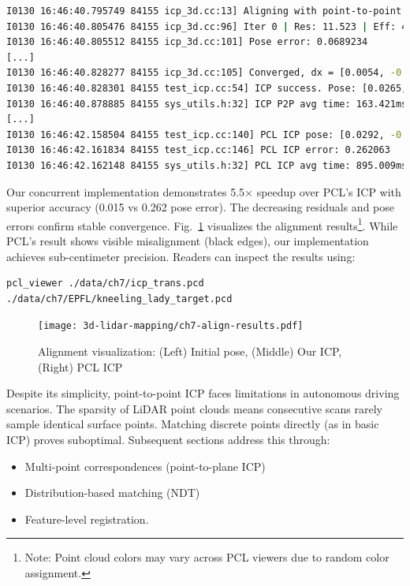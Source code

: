 \begin{lstlisting}[language=sh,caption=Terminal output]
I0130 16:46:40.795749 84155 icp_3d.cc:13] Aligning with point-to-point ICP
I0130 16:46:40.805476 84155 icp_3d.cc:96] Iter 0 | Res: 11.523 | Eff: 44455 | Avg: 0.000259 | dx: 0.027
I0130 16:46:40.805512 84155 icp_3d.cc:101] Pose error: 0.0689234
[...]
I0130 16:46:40.828277 84155 icp_3d.cc:105] Converged, dx = [0.0054, -0.0021, -0.0035, -0.0009, 0.0018, -0.0023]
I0130 16:46:40.828301 84155 test_icp.cc:54] ICP success. Pose: [0.0265, -0.0107, -0.0235, 0.9993], [-0.0689, -0.1033, 0.0050]
I0130 16:46:40.878885 84155 sys_utils.h:32] ICP P2P avg time: 163.421ms (1 runs)
[...] 
I0130 16:46:42.158504 84155 test_icp.cc:140] PCL ICP pose: [0.0292, -0.0092, -0.0195, 0.9993], [-0.0636, -0.0567, 0.0027]
I0130 16:46:42.161834 84155 test_icp.cc:146] PCL ICP error: 0.262063
I0130 16:46:42.162148 84155 sys_utils.h:32] PCL ICP avg time: 895.009ms (1 runs)
\end{lstlisting}

Our concurrent implementation demonstrates 5.5× speedup over PCL's ICP with superior accuracy (0.015 vs 0.262 pose error). The decreasing residuals and pose errors confirm stable convergence. Fig.~\ref{fig:icp-align-results} visualizes the alignment results\footnote{Note: Point cloud colors may vary across PCL viewers due to random color assignment.}. While PCL's result shows visible misalignment (black edges), our implementation achieves sub-centimeter precision. Readers can inspect the results using:

\begin{lstlisting}
pcl_viewer ./data/ch7/icp_trans.pcd ./data/ch7/EPFL/kneeling_lady_target.pcd
\end{lstlisting}

\begin{figure}
	\centering
	\texttt{[image: 3d-lidar-mapping/ch7-align-results.pdf]}
	\caption{Alignment visualization: (Left) Initial pose, (Middle) Our ICP, (Right) PCL ICP}
	\label{fig:icp-align-results}
\end{figure}

Despite its simplicity, point-to-point ICP faces limitations in autonomous driving scenarios. The sparsity of LiDAR point clouds means consecutive scans rarely sample identical surface points. Matching discrete points directly (as in basic ICP) proves suboptimal. Subsequent sections address this through:
\begin{itemize}
	\item Multi-point correspondences (point-to-plane ICP)
	\item Distribution-based matching (NDT)
	\item Feature-level registration.
\end{itemize}

